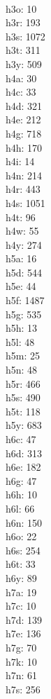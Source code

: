 \begin{multicols}{8}
  \\h3o: 10
  \\h3r: 193
  \\h3s: 1072
  \\h3t: 311
  \\h3y: 509
  \\h4a: 30
  \\h4c: 33
  \\h4d: 321
  \\h4e: 212
  \\h4g: 718
  \\h4h: 170
  \\h4i: 14
  \\h4n: 214
  \\h4r: 443
  \\h4s: 1051
  \\h4t: 96
  \\h4w: 55
  \\h4y: 274
  \\h5a: 16
  \\h5d: 544
  \\h5e: 44
  \\h5f: 1487
  \\h5g: 535
  \\h5h: 13
  \\h5l: 48
  \\h5m: 25
  \\h5n: 48
  \\h5r: 466
  \\h5s: 490
  \\h5t: 118
  \\h5y: 683
  \\h6c: 47
  \\h6d: 313
  \\h6e: 182
  \\h6g: 47
  \\h6h: 10
  \\h6l: 66
  \\h6n: 150
  \\h6o: 22
  \\h6s: 254
  \\h6t: 33
  \\h6y: 89
  \\h7a: 19
  \\h7c: 10
  \\h7d: 139
  \\h7e: 136
  \\h7g: 70
  \\h7k: 10
  \\h7n: 61
  \\h7s: 256

\end{multicols}
